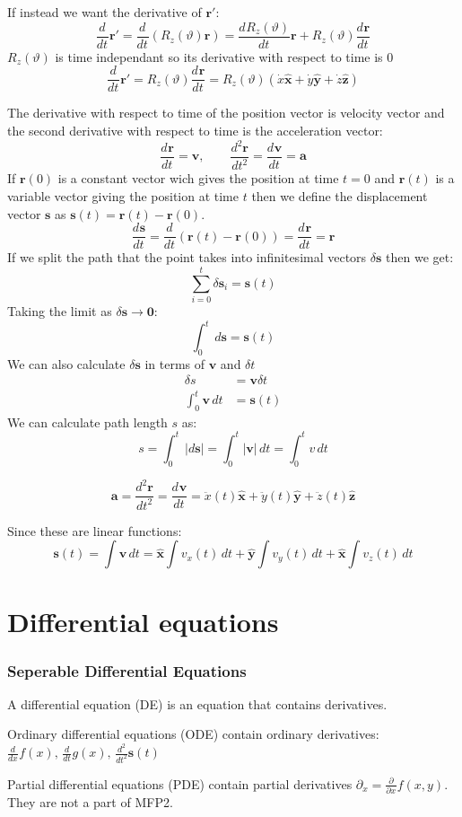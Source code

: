 \documentclass{article}
\newcommand{\vh}[1]{\vec{\hat{#1}}}
\renewcommand{\vec}[1]{\bm{#1}}
\newcommand{\vv}[1]{\vec{#1}}
\newcommand{\dv}[3][]{\frac{d^{#1}{#2}}{d{#3}^{#1}}}
\newcommand{\pdiff}[2][]{\frac{\partial^{#1}}{\partial{#2}^{#1}}}
\newcommand{\diff}[2][]{\frac{d^{#1}}{d{#2}^{#1}}}
\begin{document}
If instead we want the derivative of \(\vv r'\):
\[\diff t\vv r'=\diff t(R_z(\vartheta)\vv r)=\dv{R_z(\vartheta)}{t}\vv r+R_z(\vartheta)\dv{\vv r}{t}\]
\(R_z(\vartheta)\) is time independant so its derivative with respect to time is 0
\[\diff t\vv r'=R_z(\vartheta)\dv{\vv r}{t}=R_z(\vartheta)(\dot x\vh x+\dot y\vh y+\dot z\vh z)\]

The derivative with respect to time of the position vector is velocity vector and the second derivative with respect to time is the acceleration vector:
\[\dv{\vv r}{t}=\vv v,\qquad\dv[2]{\vv r}{t}=\dv{\vv v}{t}=\vv a\]
If \(\vv r(0)\) is a constant vector wich gives the position at time \(t=0\) and \(\vv r(t)\) is a variable vector giving the position at time \(t\) then we define the displacement vector \(\vv s\) as \(\vv s(t)=\vv r(t)-\vv r(0)\). 
\[\dv{\vv s}{t}=\diff t(\vv r(t)-\vv r(0))=\dv{\vv r}{t}=\vv r\]
If we split the path that the point takes into infinitesimal vectors \(\delta\vv s\) then we get:
\[\sum_{i=0}^t\delta\vv s_i=\vv s(t)\]
Taking the limit as \(\delta\vv s\to\vv 0\):
\[\int_0^t\,d\vv s=\vv s(t)\]
We can also calculate \(\delta\vv s\) in terms of \(\vv v\) and \(\delta t\)
\begin{align*}
\delta s&=\vv v\delta t\\
\int_0^t\vv v\,dt&=\vv s(t)
\end{align*}
We can calculate path length \(s\) as:
\[s=\int_0^t\,|d\vv s|=\int_0^t|\vv v|\,dt=\int_0^tv\,dt\]

\[\vv a = \dv[2]{\vv r}{t}=\dv{\vv v}{t}=\ddot x(t)\vh x+\ddot y(t)\vh y+\ddot z(t)\vh z\]

Since these are linear functions:
\[\vv s(t) = \int \vv v\,dt=\vh x\int v_x(t)\,dt+\vh y\int v_y(t)\,dt+\vh x\int v_z(t)\,dt\]

\part{Differential equations}
\section{Seperable Differential Equations}

A differential equation (DE) is an equation that contains derivatives.

Ordinary differential equations (ODE) contain ordinary derivatives: \(\displaystyle{\diff{x}f(x),\,\diff{t}g(x),\,\diff[2]{t}\vv s(t)}\)

Partial differential equations (PDE) contain partial derivatives \(\displaystyle{\partial_x=\pdiff{x}f(x,y)}\). They are not a part of MFP2.
\end{document}
